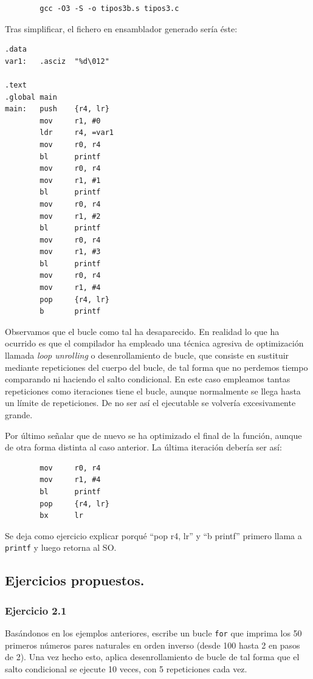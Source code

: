 \begin{lstlisting}
        gcc -O3 -S -o tipos3b.s tipos3.c
\end{lstlisting}

Tras simplificar, el fichero en ensamblador generado sería éste:

\begin{lstlisting}[caption={Código del programa tipos3b.s},label={lst:codigoPract2_7}]
.data
var1:   .asciz  "%d\012"

.text
.global main
main:   push    {r4, lr}
        mov     r1, #0
        ldr     r4, =var1
        mov     r0, r4
        bl      printf
        mov     r0, r4
        mov     r1, #1
        bl      printf
        mov     r0, r4
        mov     r1, #2
        bl      printf
        mov     r0, r4
        mov     r1, #3
        bl      printf
        mov     r0, r4
        mov     r1, #4
        pop     {r4, lr}
        b       printf
\end{lstlisting}

Observamos que el bucle como tal ha desaparecido. En realidad lo que ha ocurrido
es que el compilador ha empleado una técnica agresiva de optimización llamada
{\it loop unrolling} o desenrollamiento de bucle, que consiste en sustituir
mediante repeticiones del cuerpo del bucle, de tal forma que no perdemos tiempo
comparando ni haciendo el salto condicional. En este caso empleamos tantas repeticiones
como iteraciones tiene el bucle, aunque normalmente se llega hasta un límite de
repeticiones. De no ser así el ejecutable se volvería excesivamente grande.

Por último señalar que de nuevo se ha optimizado el final de la función, aunque de otra forma
distinta al caso anterior. La última iteración debería ser así:

\begin{lstlisting}
        mov     r0, r4
        mov     r1, #4
        bl      printf
        pop     {r4, lr}
        bx      lr
\end{lstlisting}

Se deja como ejercicio explicar porqué ``pop {r4, lr}'' y ``b printf'' primero llama
a {\tt printf} y luego retorna al SO.

\subsection{Ejercicios propuestos.}

\subsubsection{Ejercicio 2.1}
Basándonos en los ejemplos anteriores, escribe un bucle {\tt for} que imprima
los 50 primeros números pares naturales en orden inverso (desde 100 hasta 2 en pasos
de 2). Una vez hecho esto, aplica desenrollamiento de bucle de tal forma
que el salto condicional se ejecute 10 veces, con 5 repeticiones cada vez.


